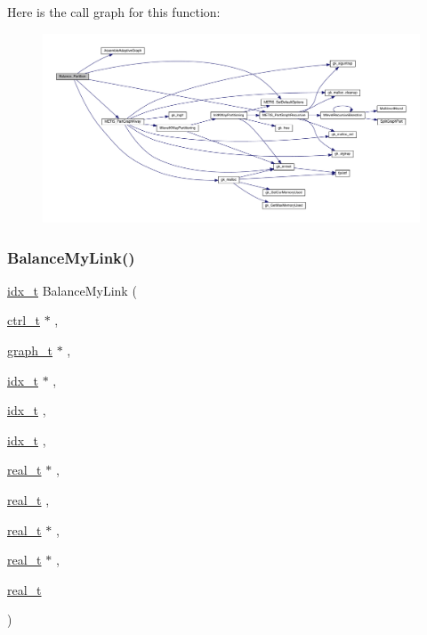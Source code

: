 Here is the call graph for this function\+:\nopagebreak
\begin{figure}[H]
\begin{center}
\leavevmode
\includegraphics[width=350pt]{a00951_aa24ead3c2c8fb3e58110f1f79453ce29_cgraph}
\end{center}
\end{figure}
\mbox{\label{a00951_ae6174038ee10a022cf14c02701556e8c}} 
\subsubsection{\texorpdfstring{Balance\+My\+Link()}{BalanceMyLink()}}
{\footnotesize\ttfamily \hyperlink{a00876_aaa5262be3e700770163401acb0150f52}{idx\+\_\+t} Balance\+My\+Link (\begin{DoxyParamCaption}\item[{\hyperlink{a00742}{ctrl\+\_\+t} $\ast$}]{,  }\item[{\hyperlink{a00734}{graph\+\_\+t} $\ast$}]{,  }\item[{\hyperlink{a00876_aaa5262be3e700770163401acb0150f52}{idx\+\_\+t} $\ast$}]{,  }\item[{\hyperlink{a00876_aaa5262be3e700770163401acb0150f52}{idx\+\_\+t}}]{,  }\item[{\hyperlink{a00876_aaa5262be3e700770163401acb0150f52}{idx\+\_\+t}}]{,  }\item[{\hyperlink{a00876_a1924a4f6907cc3833213aba1f07fcbe9}{real\+\_\+t} $\ast$}]{,  }\item[{\hyperlink{a00876_a1924a4f6907cc3833213aba1f07fcbe9}{real\+\_\+t}}]{,  }\item[{\hyperlink{a00876_a1924a4f6907cc3833213aba1f07fcbe9}{real\+\_\+t} $\ast$}]{,  }\item[{\hyperlink{a00876_a1924a4f6907cc3833213aba1f07fcbe9}{real\+\_\+t} $\ast$}]{,  }\item[{\hyperlink{a00876_a1924a4f6907cc3833213aba1f07fcbe9}{real\+\_\+t}}]{ }\end{DoxyParamCaption})}


